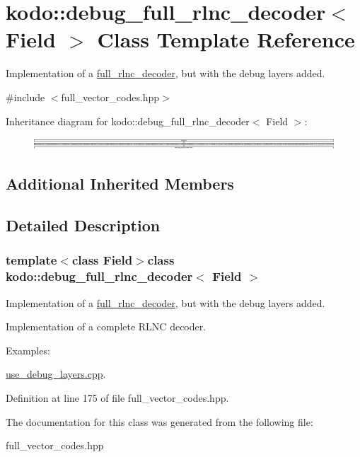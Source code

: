 \hypertarget{classkodo_1_1debug__full__rlnc__decoder}{\section{kodo\-:\-:debug\-\_\-full\-\_\-rlnc\-\_\-decoder$<$ Field $>$ Class Template Reference}
\label{classkodo_1_1debug__full__rlnc__decoder}
}


Implementation of a \hyperlink{classkodo_1_1full__rlnc__decoder}{full\-\_\-rlnc\-\_\-decoder}, but with the debug layers added.  




{\ttfamily \#include $<$full\-\_\-vector\-\_\-codes.\-hpp$>$}

Inheritance diagram for kodo\-:\-:debug\-\_\-full\-\_\-rlnc\-\_\-decoder$<$ Field $>$\-:\begin{figure}[H]
\begin{center}
\leavevmode
\includegraphics[height=0.431655cm]{classkodo_1_1debug__full__rlnc__decoder}
\end{center}
\end{figure}
\subsection*{Additional Inherited Members}


\subsection{Detailed Description}
\subsubsection*{template$<$class Field$>$class kodo\-::debug\-\_\-full\-\_\-rlnc\-\_\-decoder$<$ Field $>$}

Implementation of a \hyperlink{classkodo_1_1full__rlnc__decoder}{full\-\_\-rlnc\-\_\-decoder}, but with the debug layers added. 

Implementation of a complete R\-L\-N\-C decoder. \begin{Desc}
\item[Examples\-: ]\par
\hyperlink{use_debug_layers_8cpp-example}{use\-\_\-debug\-\_\-layers.\-cpp}.\end{Desc}


Definition at line 175 of file full\-\_\-vector\-\_\-codes.\-hpp.



The documentation for this class was generated from the following file\-:\begin{DoxyCompactItemize}
\item 
full\-\_\-vector\-\_\-codes.\-hpp\end{DoxyCompactItemize}
